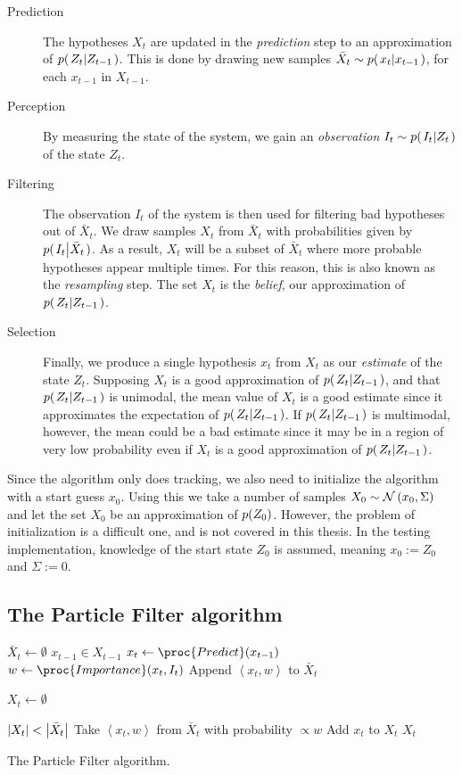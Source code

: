 \begin{description}
\item[Prediction] The hypotheses $X_t$ are updated in the \emph{prediction} step to an approximation of $p{(\left. Z_t \middle\vert Z_{t-1} \right.)}$. This is done by drawing new samples $\bar{X}_t \sim p{(\left. x_t \middle\vert x_{t-1} \right.)}$, for each $x_{t-1}$ in $X_{t-1}$.
\item[Perception] By measuring the state of the system, we gain an \emph{observation} $I_t \sim p{(\left. I_t \middle\vert Z_t \right.)}$ of the state $Z_t$.
\item[Filtering] The observation $I_t$ of the system is then used for filtering bad hypotheses out of $\bar{X}_t$. We draw samples $X_t$ from $\bar{X}_t$ with probabilities given by $p{(\left. I_t \middle\vert \bar{X}_t \right.)}$. As a result, $X_t$ will be a subset of $\bar{X}_t$ where more probable hypotheses appear multiple times. For this reason, this is also known as the \emph{resampling} step. The set $X_t$ is the \emph{belief}, our approximation of $p{(\left. Z_t \middle\vert Z_{t-1} \right.)}$.
\item[Selection] Finally, we produce a single hypothesis $x_t$ from $X_t$ as our \emph{estimate} of the state $Z_t$. Supposing $X_t$ is a good approximation of $p{(\left. Z_t \middle\vert Z_{t-1} \right.)}$, and that $p{(\left. Z_t \middle\vert Z_{t-1} \right.)}$ is unimodal, the mean value of $X_t$ is a good estimate since it approximates the expectation of $p{(\left. Z_t \middle\vert Z_{t-1} \right.)}$. If $p{(\left. Z_t \middle\vert Z_{t-1} \right.)}$ is multimodal, however, the mean could be a bad estimate since it may be in a region of very low probability even if $X_t$ is a good approximation of $p{(\left. Z_t \middle\vert Z_{t-1} \right.)}$.
\end{description}

Since the algorithm only does tracking, we also need to initialize the algorithm with a start guess $x_0$. Using this we take a number of samples $X_0 \sim \mathcal{N}\left(x_0, \Sigma\right)$ and let the set $X_0$ be an approximation of $p{(Z_0)}$. However, the problem of initialization is a difficult one\cite{Hedvig}, and is not covered in this thesis. In the testing implementation, knowledge of the start state $Z_0$ is assumed, meaning $x_0 := Z_0$ and $\Sigma := 0$.



\subsection{The Particle Filter algorithm}
\begin{table}
  \begin{codebox}
    \li $\bar{X}_t \gets \emptyset$
    \li \ForEach $x_{t-1} \in X_{t-1}$
    \li \Do
    \li $x_t \gets \proc{Predict}(x_{t-1})$
    \li $w \gets \proc{Importance}(x_t,I_t)$
    \li Append $\left<x_t, w\right>$ to $\bar{X}_t$
    \End
    \li
    
    \li $X_t \gets \emptyset$
    
    \li \While $\left\vert X_t \right\vert < \left\vert \bar{X}_t \right\vert$
    \li \Do
    \li Take $\left<x_t, w\right>$ from $\bar{X}_t$ with probability $\propto w$
    \li Add $x_t$ to $X_t$
    \End
    \li \Return $X_t$
  \end{codebox}
  \caption{The Particle Filter algorithm.}
  \label{alg:pf}
\end{table}

